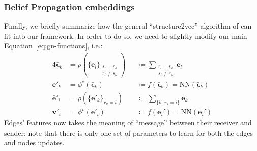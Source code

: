 \subsubsection*{Belief Propagation embeddings}

Finally, we briefly summarize how the general ``structure2vec'' algorithm of \cite{dai2016} can fit into our framework. In order to do so, we need to slightly modify our main Equation~\ref{eq:gn-functions}, i.e.:
\begin{alignat*}{4}
      \bm{\bar{\epsilon}}_k &= \rho \left(  \{ \mathbf{e}_l \}_{\substack{s_l = r_k \\ r_l \neq s_k}}\right) && \coloneqq  \sum_{\substack{r_l = s_k \\ s_l \neq r_k}} \mathbf{e}_l \\
    \mathbf{e}'_k &= \phi^e\left(\bm{\bar{\epsilon}}_k \right) &&\coloneqq f(\bm{\bar{\epsilon}}_k) = \mathrm{NN}(\bm{\bar{\epsilon}}_k) \\
    \mathbf{\bar{e}}'_i &= \rho \left( \{ \mathbf{e}'_k \}_{r_k = i} \right) && \coloneqq \sum_{\{k:\, r_k = i\}}  \mathbf{\mathbf{e}}_k \\
    \mathbf{v}'_i &= \phi^v\left(\mathbf{\bar{e}}'_i\right) &&\coloneqq f(\mathbf{\bar{e}}_i')  =  \mathrm{NN}(\mathbf{\bar{e}}_i')
 \end{alignat*}
Edges' features now takes the meaning of ``message'' between their receiver and sender; note that there is only one set of parameters to learn for both the edges and nodes updates.
